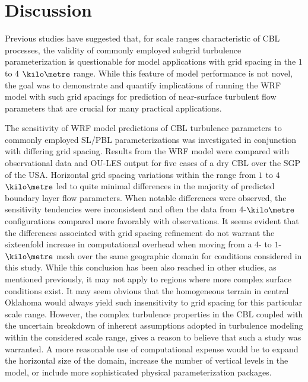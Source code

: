 \section{Discussion}
\label{dis-48}

Previous studies have suggested that, for scale ranges characteristic of CBL processes, the validity of commonly employed subgrid turbulence parameterization is questionable for model applications with grid spacing in the $1$ to $4$ $\kilo\metre$ range. While this feature of model performance is not novel, the goal was to demonstrate and quantify implications of running the WRF model with such grid spacings for prediction of near-surface turbulent flow parameters that are crucial for many practical applications. 

The sensitivity of WRF model predictions of CBL turbulence parameters to commonly employed SL\slash PBL parameterizations was investigated in conjunction with differing grid spacing. Results from the WRF model were compared with observational data and OU-LES output for five cases of a dry CBL over the SGP of the USA. Horizontal grid spacing variations within the range from $1$ to $4$ $\kilo\metre$ led to quite minimal differences in the majority of predicted boundary layer flow parameters. When notable differences were observed, the sensitivity tendencies were inconsistent and often the data from $4$-$\kilo\metre$ configurations compared more favorably with observations. It seems evident that the differences associated with grid spacing refinement do not warrant the sixteenfold increase in computational overhead when moving from a $4$- to $1$- $\kilo\metre$ mesh over the same geographic domain for conditions considered in this study. While this conclusion has been also reached in other studies, as mentioned previously, it may not apply to regions where more complex surface conditions exist. It may seem obvious that the homogeneous terrain in central Oklahoma would always yield such insensitivity to grid spacing for this particular scale range. However, the complex turbulence properties in the CBL coupled with the uncertain breakdown of inherent assumptions adopted in turbulence modeling within the considered scale range, gives a reason to believe that such a study was warranted. A more reasonable use of computational expense would be to expand the horizontal size of the domain, increase the number of vertical levels in the model, or include more sophisticated physical parameterization packages.

